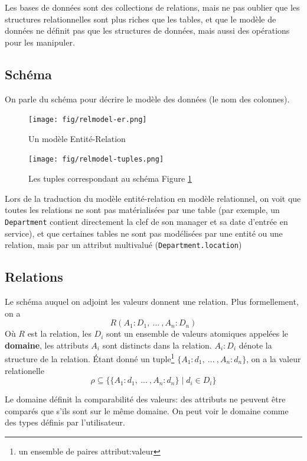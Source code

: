 \documentclass[a4paper]{article}
\begin{document}
Les bases de données sont des collections de relations, mais ne pas oublier que
les structures relationnelles sont plus riches que les tables, et que le modèle de 
données ne définit pas que les structures de données, mais aussi des opérations
pour les manipuler.

\subsection{Schéma}
On parle du schéma pour décrire le modèle des données (le nom des colonnes).

\begin{figure}[H]
    \center
    \texttt{[image: fig/relmodel-er.png]}
    \caption{\label{fig:relmodel-er}Un modèle Entité-Relation}
\end{figure}
\begin{figure}[H]
    \center
    \texttt{[image: fig/relmodel-tuples.png]}
    \caption{Les tuples correspondant au schéma Figure \ref{fig:relmodel-er}}
\end{figure}

Lors de la traduction du modèle entité-relation en modèle relationnel, on voit
que toutes les relations ne sont pas matérialisées par une table (par exemple,
un \texttt{Department} contient directement la clef de son manager et sa date d'entrée en service),
et que certaines tables ne sont pas modélisées par une entité ou une relation, mais
par un attribut multivalué (\texttt{Department.location})

\subsection{Relations}
Le schéma auquel on adjoint les valeurs donnent une relation. Plus formellement, on a
\begin{equation}
  R(A_1:D_1, ~ ... ~ , A_n:D_n)
\end{equation}
Où $R$ est la relation, les $D_i$ sont un ensemble de valeurs atomiques appelées le \textbf{domaine},
les attributs $A_i$ sont distincts dans la relation. $A_i : D_i$ dénote la structure de la relation.
\'Etant donné un tuple\footnote{un ensemble de paires attribut:valeur} $\{A_1: d_1, ~...~, A_n: d_n\}$, on a la valeur relationelle
\begin{equation}
  \rho \subseteq \{\{A_1:d_1, ~...~, A_n:d_n\} \mid d_i \in D_i\}
\end{equation}

Le domaine définit la comparabilité des valeurs: des attributs ne peuvent être comparés
que s'ils sont sur le même domaine. On peut voir le domaine comme des types définis par
l'utilisateur.
\end{document}

